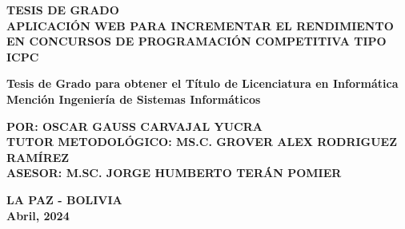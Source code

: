 \begin{titlepage}
\begin{center}
		{\fontsize{16}{20}\selectfont \textbf{TESIS DE GRADO}}\\
		
        {\fontsize{16}{18}\selectfont \textbf{APLICACIÓN WEB PARA INCREMENTAR EL RENDIMIENTO EN CONCURSOS DE PROGRAMACIÓN COMPETITIVA TIPO ICPC}}
		
		{\fontsize{12}{12}\selectfont\textbf{Tesis de Grado para obtener el Título de Licenciatura en Informática Mención Ingeniería de Sistemas Informáticos}}
		
		{\fontsize{16}{16}\selectfont\textbf{POR: OSCAR GAUSS CARVAJAL YUCRA}}\\
    	{\fontsize{14}{14}\selectfont\textbf{TUTOR METODOLÓGICO: MS.C. GROVER ALEX RODRIGUEZ RAMÍREZ\\
    	ASESOR: M.SC. JORGE HUMBERTO TERÁN POMIER}}
		 
		\textbf{LA PAZ - BOLIVIA\\
		Abril, 2024}
	\end{center}
\end{titlepage}